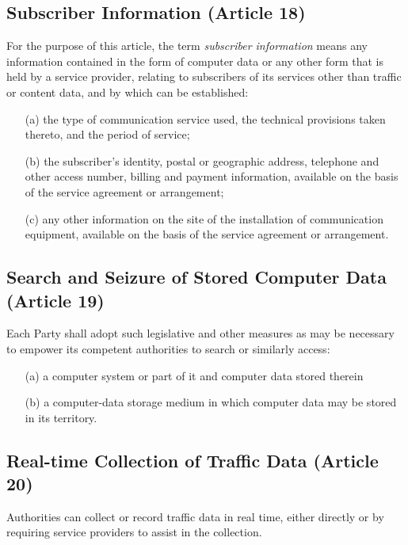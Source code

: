 \subsection{Subscriber Information (Article 18)}

For the purpose of this article, the term \textit{subscriber
information} means any information contained in the form of computer
data or any other form that is held by a service provider, relating to
subscribers of its services other than traffic or content data, and by
which can be established:

\begin{itemize}
    \item[(a)] the type of communication service used, the technical
      provisions taken thereto, and the period of service;
    \item[(b)] the subscriber's identity, postal or geographic
      address, telephone and other access number, billing and payment
      information, available on the basis of the service agreement or
      arrangement;
    \item[(c)] any other information on the site of the installation
      of communication equipment, available on the basis of the
      service agreement or arrangement.
\end{itemize}

\subsection{Search and Seizure of Stored Computer Data (Article 19)}

Each Party shall adopt such legislative and other measures as may be
necessary to empower its competent authorities to search or similarly
access:

\begin{itemize}
    \item[(a)] a computer system or part of it and computer data
      stored therein
    \item[(b)] a computer-data storage medium in which computer data
      may be stored in its territory.
\end{itemize}

\subsection{Real-time Collection of Traffic Data (Article 20)}

Authorities can collect or record traffic data in real time, either
directly or by requiring service providers to assist in the
collection.

